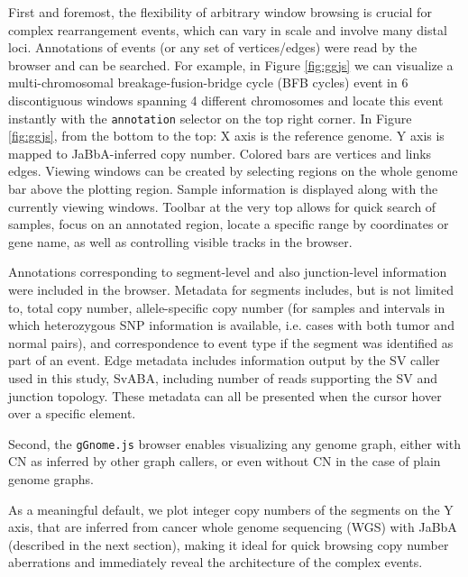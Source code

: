 \documentclass[phd,tocprelim]{cornell}
\begin{document}
\clearpage
% 
First and foremost, the flexibility of arbitrary window browsing is crucial for complex rearrangement events, which can vary in scale and involve many distal loci. Annotations of events (or any set of vertices/edges) were read by the browser and can be searched. For example, in Figure \ref{fig:ggjs} we can visualize a multi-chromosomal breakage-fusion-bridge cycle (BFB cycles) event in 6 discontiguous windows spanning 4 different chromosomes and locate this event instantly with the \texttt{annotation} selector on the top right corner. In Figure \ref{fig:ggjs}, from the bottom to the top: X axis is the reference genome. Y axis is mapped to JaBbA-inferred copy number. Colored bars are vertices and links edges. Viewing windows can be created by selecting regions on the whole genome bar above the plotting region. Sample information is displayed along with the currently viewing windows. Toolbar at the very top allows for quick search of samples, focus on an annotated region, locate a specific range by coordinates or gene name, as well as controlling visible tracks in the browser.


Annotations corresponding to segment-level and also junction-level information were included in the browser. Metadata for segments includes, but is not limited to, total copy number, allele-specific copy number (for samples and intervals in which heterozygous SNP information is available, i.e. cases with both tumor and normal pairs), and correspondence to event type if the segment was identified as part of an event. Edge metadata includes information output by the SV caller used in this study, SvABA, including number of reads supporting the SV and junction topology. These metadata can all be presented when the cursor hover over a specific element.

Second, the \texttt{gGnome.js} browser enables visualizing any genome graph, either with CN as inferred by other graph callers, or even without CN in the case of plain genome graphs. 

As a meaningful default, we plot integer copy numbers of the segments on the Y axis, that are inferred from cancer whole genome sequencing (WGS) with JaBbA (described in the next section), making it ideal for quick browsing copy number aberrations and immediately reveal the architecture of the complex events. 
\end{document}
